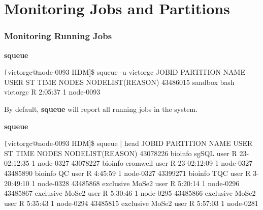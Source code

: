 \section[Monitoring Jobs and Partitions]{Monitoring Jobs and Partitions}
\begin{frame}[fragile]
\frametitle{Monitoring Running Jobs}
\begin{block}{\textbf{squeue}}
\begin{semiverbatim}\tiny \texttt
[victorgc@node-0093 HDM]\$ squeue -u victorgc
             JOBID PARTITION     NAME     USER ST       TIME  NODES NODELIST(REASON)
          43486015   sandbox     bash victorgc  R    2:05:37      1 node-0093
\end{semiverbatim}
\end{block}
By default, \textbf{squeue} will report all running jobs in the system.
\begin{block}{\textbf{squeue}}
\begin{semiverbatim}\tiny \texttt
[victorgc@node-0093 HDM]\$ squeue | head
             JOBID PARTITION     NAME     USER ST       TIME  NODES NODELIST(REASON)
          43078226   bioinfo    sgSQL     user  R 23-02:12:35      1 node-0327
          43078227   bioinfo cromwell     user  R 23-02:12:09      1 node-0327
          43485890   bioinfo       QC     user  R    4:45:59      1 node-0327
          43399271   bioinfo      TQC     user  R 3-20:49:10      1 node-0328
          43485868 exclusive    MoSe2     user  R    5:20:14      1 node-0296
          43485867 exclusive    MoSe2     user  R    5:30:46      1 node-0295
          43485866 exclusive    MoSe2     user  R    5:35:43      1 node-0294
          43485815 exclusive    MoSe2     user  R    5:57:03      1 node-0281
\end{semiverbatim}
\end{block}

\end{frame}

